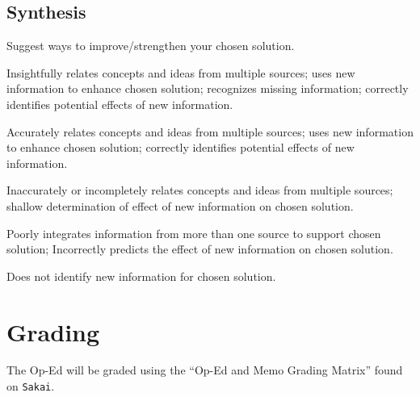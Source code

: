 \documentclass{tufte-handout}\usepackage[]{graphicx}\usepackage[]{color}
\newenvironment{enumerate*}%
  {\begin{enumerate}%
    \setlength{\itemsep}{0pt}%
    \setlength{\parskip}{0pt}}%
  {\end{enumerate}}
\begin{document}
\subsection{Synthesis}

Suggest ways to improve/strengthen your chosen solution.

\begin{enumerate*}
	\item Insightfully relates concepts and ideas from multiple sources; uses new information to enhance chosen solution; recognizes missing information; correctly identifies potential effects of new information.	
	\item Accurately relates concepts and ideas from multiple sources; uses new information to enhance chosen solution; correctly identifies potential effects of new information.	
	\item Inaccurately or incompletely relates concepts and ideas from multiple sources; shallow determination of effect of new information on chosen solution.	
	\item Poorly integrates information from more than one source to support chosen solution; Incorrectly predicts the effect of new information on chosen solution.	
	\item Does not identify new information for chosen solution.	
\end{enumerate*}

\section{Grading}

The Op-Ed will be graded using the ``Op-Ed and Memo Grading Matrix'' found on \texttt{Sakai}.
\end{document}
